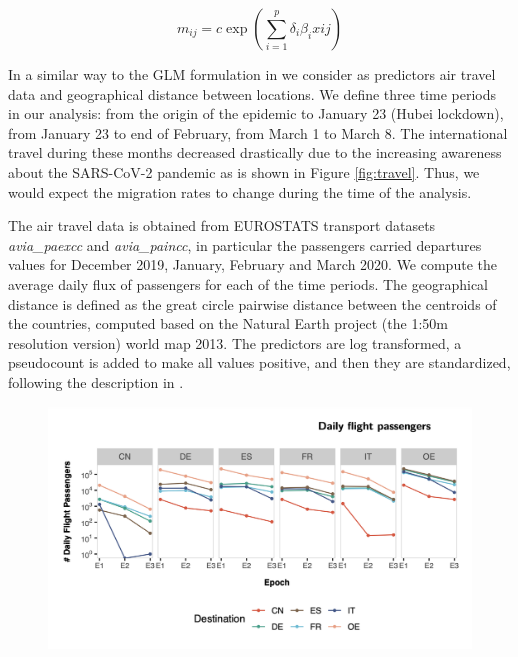 \begin{equation}
m_{ij} = c \exp(\sum_{i = 1}^p \delta_i \beta_i xij)
\label{eq:glm}
\end{equation}

In a similar way to the GLM formulation in \cite{Lemey2020} we consider as predictors air travel data and geographical distance between locations. We define three time periods in our analysis: from the origin of the epidemic to January 23 (Hubei lockdown), from January 23 to end of February, from March 1 to March 8. The international travel during these months decreased drastically due to the increasing awareness about the SARS-CoV-2 pandemic as is shown in Figure \ref{fig:travel}. Thus, we would expect the migration rates to change during the time of the analysis. 

The air travel data is obtained from EUROSTATS transport datasets \textit{avia\_paexcc} and \textit{avia\_paincc}, in particular the passengers carried departures values for December 2019, January, February and March 2020. We compute the average daily flux of passengers for each of the time periods. The geographical distance is defined as the great circle pairwise distance between the centroids of the countries, computed based on the Natural Earth project (the 1:50m resolution version) world map 2013. The predictors are log transformed, a pseudocount is added to make all values positive, and then they are standardized, following the description in \cite{Lemey2014}.

\begin{figure}[h]
    \centering
    \includegraphics[width=\textwidth]{figures/flight_data.png}
    \caption{}
    \label{fig:epitrajs}
\end{figure}

